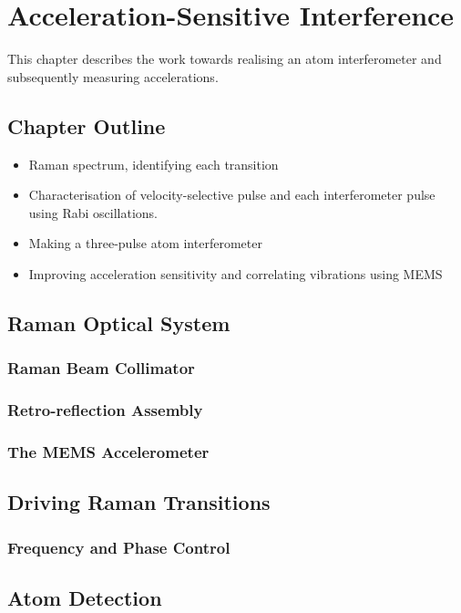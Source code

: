 \chapter{Acceleration-Sensitive Interference}\label{chap:atom_int}
This chapter describes the work towards realising an atom interferometer and subsequently measuring accelerations.
\section{Chapter Outline}
\begin{itemize}
    \item Raman spectrum, identifying each transition
    \item Characterisation of velocity-selective pulse and each interferometer pulse using Rabi oscillations.
    \item Making a three-pulse atom interferometer
    \item Improving acceleration sensitivity and correlating vibrations using MEMS
\end{itemize}
\section{Raman Optical System}\label{sec:setup_ramanoptics}
\subsection{Raman Beam Collimator}\label{subsec:setup_ramancollimator}
\subsection{Retro-reflection Assembly}\label{subsec:setup_ramanmirror}
\subsection{The MEMS Accelerometer}\label{subsec:raman_mems}

\section{Driving Raman Transitions}
\subsection{Frequency and Phase Control}\label{subsec:msquared_comm}

\section{Atom Detection}
